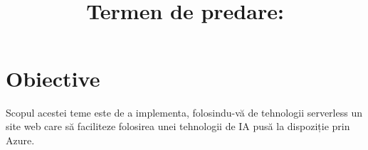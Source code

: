 \documentclass{article}
\title{
\textmd{\textbf{\MNClass \\ \MNTitle}}\\
\normalsize\vspace{0.1in}\small{Termen de predare: \MNDueDate}\\
}
\date{} %
\begin{document}
\maketitle





\section{Obiective}

Scopul acestei teme este de a implementa, folosindu-vă de tehnologii serverless un site web care să faciliteze folosirea unei tehnologii de IA pusă la dispoziție prin Azure.


\end{document}
